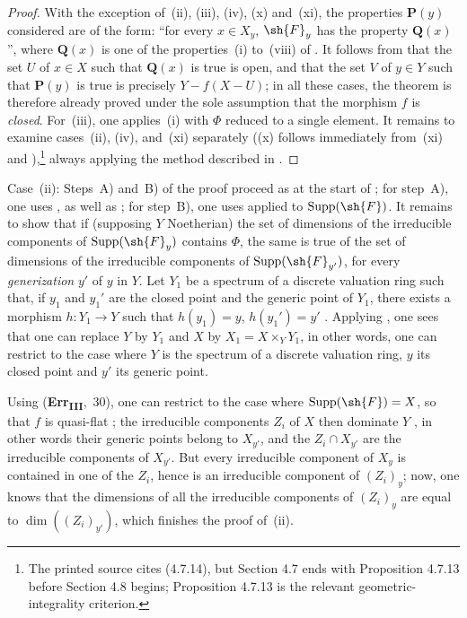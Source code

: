 \begin{proof}
With the exception of~(ii), (iii), (iv), (x) and~(xi), the properties $\mathbf{P}(y)$ considered are of the form: ``for every $x\in X_y$, $\sh{F}_y$ has the property $\mathbf{Q}(x)$'', where $\mathbf{Q}(x)$ is one of the properties~(i) to~(viii) of .
It follows from  that the set $U$ of $x\in X$ such that $\mathbf{Q}(x)$ is true is open, and that the set $V$ of $y\in Y$ such that $\mathbf{P}(y)$ is true is precisely $Y-f(X-U)$; in all these cases, the theorem is therefore already proved under the sole assumption that the morphism $f$ is \emph{closed}.
For~(iii), one applies~(i) with $\Phi$ reduced to a single element.
It remains to examine cases~(ii), (iv), and~(xi) separately ((x) follows immediately from~(xi) and ),\footnote{The printed source cites (4.7.14), but Section 4.7 ends with Proposition 4.7.13 before Section 4.8 begins; Proposition 4.7.13 is the relevant geometric-integrality criterion.} always applying the method described in .
\end{proof}

\begin{env}[12.2.1.1]
\label{IV.12.2.1.1}
Case~(ii): Steps~A) and~B) of the proof proceed as at the start of ; for step~A), one uses ,  as well as ; for step~B), one uses  applied to $\operatorname{Supp}(\sh{F})$.
It remains to show that if (supposing $Y$ Noetherian) the set of dimensions of the irreducible components of $\operatorname{Supp}(\sh{F}_y)$ contains $\Phi$, the same is true of the set of dimensions of the irreducible components of $\operatorname{Supp}(\sh{F}_{y'})$, for every \emph{generization} $y'$ of $y$ in $Y$.
Let $Y_1$ be a spectrum of a discrete valuation ring such that, if $y_1$ and $y_1'$ are the closed point and the generic point of $Y_1$, there exists a morphism $h:Y_1\to Y$ such that $h(y_1)=y$, $h(y_1')=y'$ .
Applying , one sees that one can replace $Y$ by $Y_1$ and $X$ by $X_1=X\times_Y Y_1$, in other words, one can restrict to the case where $Y$ is the spectrum of a discrete valuation ring, $y$ its closed point and $y'$ its generic point.

Using (\textbf{Err}\textsubscript{\textbf{III}},~30), one can restrict to the case where $\operatorname{Supp}(\sh{F})=X$, so that $f$ is quasi-flat ; the irreducible components $Z_i$ of $X$ then dominate $Y$ , in other words their generic points belong to $X_{y'}$, and the $Z_i\cap X_{y'}$ are the irreducible components of $X_{y'}$.
But every irreducible component of $X_y$ is contained in one of the $Z_i$, hence is an irreducible component of $(Z_i)_y$; now, one knows  that the dimensions of all the irreducible components of $(Z_i)_y$ are equal to $\dim((Z_i)_{y'})$, which finishes the proof of~(ii).
\end{env}

